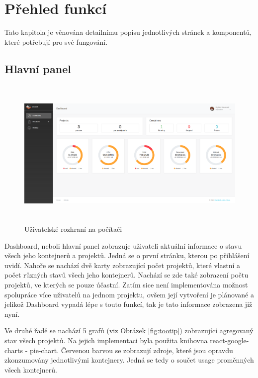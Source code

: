 \documentclass[a4paper,oneside,12pt]{report}
\begin{document}
\section{Přehled funkcí}

Tato kapitola je věnována detailnímu popisu jednotlivých stránek a komponentů, které potřebují pro své fungování.

\subsection{Hlavní panel}

\begin{figure}[h]
	\centering
	\includegraphics[height=7.3cm]{../img/dashboard.png}
	\caption[Uživatelské rozhraní na počítači, vlastní tvorba]{Uživatelské rozhraní na počítači \linebreak}
	\label{fig:desktopRes}
\end{figure}

Dashboard, neboli hlavní panel zobrazuje uživateli aktuální informace o stavu všech jeho kontejnerů a projektů.
Jedná se o první stránku, kterou po přihlášení uvidí.
Nahoře se nachází dvě karty zobrazující počet projektů, které vlastní a počet různých stavů všech jeho kontejnerů.
Nachází se zde také zobrazení počtu projektů, ve kterých se pouze účastní.
Zatím sice není implementována možnost spolupráce více uživatelů na jednom projektu, ovšem její vytvoření je plánované a jelikož Dashboard vypadá lépe s touto funkcí, tak je tato informace zobrazena již nyní.

Ve druhé řadě se nachází 5 grafů (viz Obrázek \ref{fig:tootip}) zobrazující agregovaný stav všech projektů.
Na jejich implementaci byla použita knihovna react-google-charts - pie-chart.
Červenou barvou se zobrazují zdroje, které jsou opravdu zkonzumovány jednotlivými kontejnery.
Jedná se tedy o součet usage proměnných všech kontejnerů.
\end{document}
